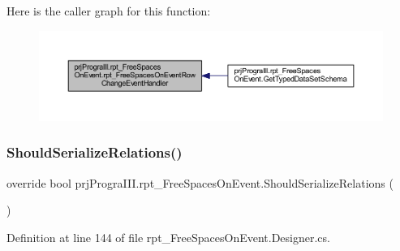 Here is the caller graph for this function\+:
\nopagebreak
\begin{figure}[H]
\begin{center}
\leavevmode
\includegraphics[width=350pt]{classprj_progra_i_i_i_1_1rpt___free_spaces_on_event_a19ccb59e3a6fc2f077280510cfdf1d21_icgraph}
\end{center}
\end{figure}
\hypertarget{classprj_progra_i_i_i_1_1rpt___free_spaces_on_event_ab551797102c97baa079f92ed6b39a18d}{}\label{classprj_progra_i_i_i_1_1rpt___free_spaces_on_event_ab551797102c97baa079f92ed6b39a18d} 
\subsubsection{\texorpdfstring{Should\+Serialize\+Relations()}{ShouldSerializeRelations()}}
{\footnotesize\ttfamily override bool prj\+Progra\+I\+I\+I.\+rpt\+\_\+\+Free\+Spaces\+On\+Event.\+Should\+Serialize\+Relations (\begin{DoxyParamCaption}{ }\end{DoxyParamCaption})\hspace{0.3cm}{\ttfamily [protected]}}



Definition at line 144 of file rpt\+\_\+\+Free\+Spaces\+On\+Event.\+Designer.\+cs.

\hypertarget{classprj_progra_i_i_i_1_1rpt___free_spaces_on_event_a29f352bac92cd416a967007938cca0cd}{}\label{classprj_progra_i_i_i_1_1rpt___free_spaces_on_event_a29f352bac92cd416a967007938cca0cd} 
